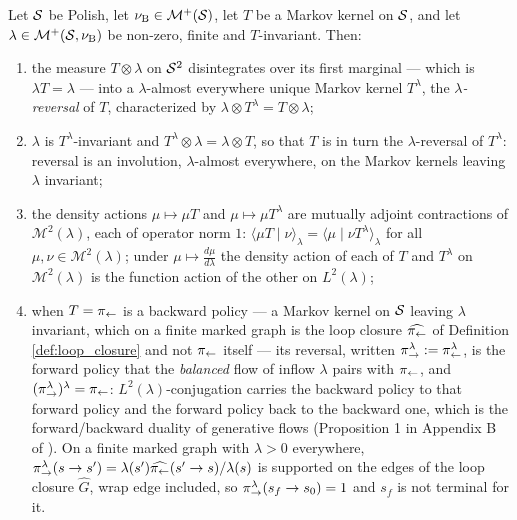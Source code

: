 \begin{lemma}\label{lem:adjoint}
Let $\mathcal S$ be Polish, let $\nu_{\mathrm{B}} \in \mathcal M^+(\mathcal S)$, let $T$ be a Markov kernel on $\mathcal S$, and let $\lambda\in \mathcal M^+(\mathcal S,\nu_{\mathrm{B}})$ be non-zero, finite and $T$-invariant. Then:
\begin{enumerate}
    \item the measure $T\otimes\lambda$ on $\mathcal S^2$ disintegrates over its first marginal --- which is $\lambda T=\lambda$ --- into a $\lambda$-almost everywhere unique Markov kernel $T^\lambda$, the \emph{$\lambda$-reversal} of $T$, characterized by $\lambda\otimes T^\lambda= T\otimes \lambda$;
    \item $\lambda$ is $T^\lambda$-invariant and $T^\lambda\otimes\lambda = \lambda\otimes T$, so that $T$ is in turn the $\lambda$-reversal of $T^\lambda$: reversal is an involution, $\lambda$-almost everywhere, on the Markov kernels leaving $\lambda$ invariant;
    \item the density actions $\mu\mapsto \mu T$ and $\mu\mapsto \mu T^\lambda$ are mutually adjoint contractions of $\mathcal M^2(\lambda)$, each of operator norm $1$: $\langle \mu T\mid \nu\rangle_\lambda = \langle \mu \mid \nu T^\lambda\rangle_\lambda$ for all $\mu,\nu\in\mathcal M^2(\lambda)$; under $\mu\mapsto\frac{d\mu}{d\lambda}$ the density action of each of $T$ and $T^\lambda$ on $\mathcal M^2(\lambda)$ is the function action of the other on $L^2(\lambda)$;
    \item when $T=\pi_{\leftarrow}$ is a backward policy --- a Markov kernel on $\mathcal S$ leaving $\lambda$ invariant, which on a finite marked graph is the loop closure $\widehat{\pi_{\leftarrow}}$ of Definition \ref{def:loop_closure} and not $\pi_{\leftarrow}$ itself --- its reversal, written $\pi_{\rightarrow}^\lambda:=\pi_{\leftarrow}^\lambda$, is the forward policy that the \emph{balanced} flow of inflow $\lambda$ pairs with $\pi_{\leftarrow}$, and $(\pi_{\rightarrow}^\lambda)^\lambda=\pi_{\leftarrow}$: $L^2(\lambda)$-conjugation carries the backward policy to that forward policy and the forward policy back to the backward one, which is the forward/backward duality of generative flows (Proposition 1 in Appendix B of \citet{brunswic2024theory}). On a finite marked graph with $\lambda>0$ everywhere, $\pi_{\rightarrow}^\lambda(s\rightarrow s')=\lambda(s')\widehat{\pi_{\leftarrow}}(s'\rightarrow s)/\lambda(s)$ is supported on the edges of the loop closure $\widehat G$, wrap edge included, so $\pi_{\rightarrow}^\lambda(s_f\rightarrow s_0)=1$ and $s_f$ is not terminal for it.
\end{enumerate}
\end{lemma}


